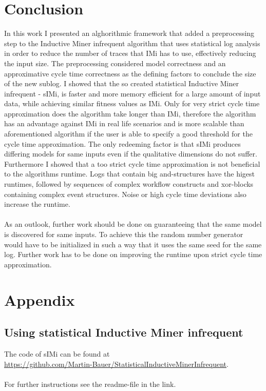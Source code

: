 \documentclass[
	a4paper,
	pagesize,
	pdftex,
	12pt,
	twoside, %
	BCOR=5mm, %
	ngerman,
	fleqn,
	final,
	]{scrartcl}
\begin{document}
\section{Conclusion}
In this work I presented an alghorithmic framework that added a preprocessing step to the Inductive Miner infrequent algorithm that uses statistical log analysis in order to reduce the number of traces that IMi has to use, effectively reducing the input size. The preprocessing considered model correctness and an approximative cycle time correctness as the defining factors to conclude the size of the new sublog.
I showed that the so created statistical Inductive Miner infrequent - sIMi, is faster and more memory efficient for a large amount of input data, while achieving similar fitness values as IMi. Only for very strict cycle time approximation does the algorithm take longer than IMi, therefore the algorithm has an advantage against IMi in real life scenarios and is more scalable than aforementioned algorithm if the user is able to specify a good threshold for the cycle time approximation. The only redeeming factor is that sIMi produces differing models for same inputs even if the qualitative dimensions do not suffer.\\
Furthermore I showed that a too strict cycle time approximation is not beneficial to the algorithms runtime. Logs that contain big and-structures have the higest runtimes, followed by sequences of complex workflow constructs and xor-blocks containing complex event structures. Noise or high cycle time deviations also increase the runtime.\\\\

As an outlook, further work should be done on guaranteeing that the same model is discovered for same inputs. To achieve this the random number generator would have to be initialized in such a way that it uses the same seed for the same log. Further work has to be done on improving the runtime upon strict cycle time approximation.
\section{Appendix}
\subsection{Using statistical Inductive Miner infrequent}
The code of sIMi can be found at\\
\url{https://github.com/Martin-Bauer/StatisticalInductiveMinerInfrequent}.\\\\
For further instructions see the readme-file in the link.
\newpage


{}

\selbstaendigkeitserklaerung{\today}
\end{document}
